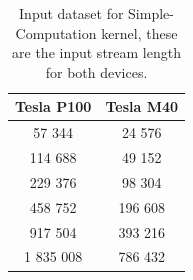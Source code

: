 	\begin{table}	
		\centering
		\begin{tabular}{| c c |} 
			\hline
			\textbf{Tesla P100} & \textbf{Tesla M40} \\ [0.5ex] 
			\hline\hline
			
			57 344 & 24 576  \\ 
			\hline		
			114 688	& 49 152  \\ 
			\hline			
			229 376 & 98 304 \\
			\hline				
			458 752 & 196 608 \\
			\hline
			917 504 & 393 216 \\
			\hline
			1 835 008 & 786 432 \\
			\hline
			
			
		\end{tabular}
		\caption{Input dataset for Simple-Computation kernel, these are the input stream length for both devices.}	
		\label{tab:cosdata}		
	\end{table}

